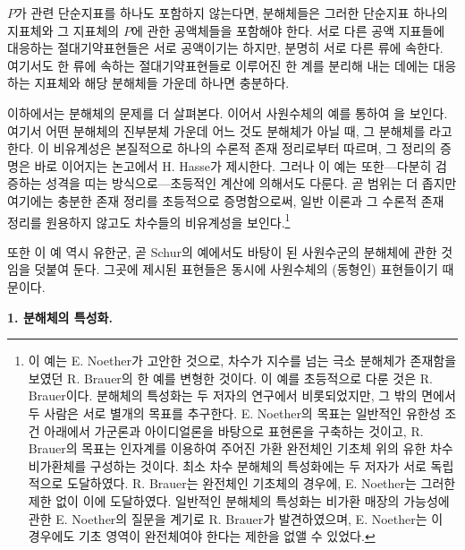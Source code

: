 $P$가 관련 단순지표를 하나도 포함하지 않는다면, 분해체들은 그러한 단순지표 하나의 지표체와 그 지표체의 $P$에 관한 공액체들을 포함해야 한다. 서로 다른 공액 지표들에 대응하는 절대기약표현들은 서로 공액이기는 하지만, 분명히 서로 다른 류에 속한다. 여기서도 한 류에 속하는 절대기약표현들로 이루어진 한 계를 분리해 내는 데에는 대응하는 지표체와 해당 분해체들 가운데 하나면 충분하다.

이하에서는 분해체의 문제를 더 살펴본다.  이어서 사원수체의 예를 통하여 을 보인다. 여기서 어떤 분해체의 진부분체 가운데 어느 것도 분해체가 아닐 때, 그 분해체를 라고 한다. 이 비유계성은 본질적으로 하나의 수론적 존재 정리로부터 따르며, 그 정리의 증명은 바로 이어지는 논고에서 H. Hasse가 제시한다. 그러나 이 예는 또한---다분히 검증하는 성격을 띠는 방식으로---초등적인 계산에 의해서도 다룬다. 곧 범위는 더 좁지만 여기에는 충분한 존재 정리를 초등적으로 증명함으로써, 일반 이론과 그 수론적 존재 정리를 원용하지 않고도 차수들의 비유계성을 보인다.\footnote{이 예는 E. Noether가 고안한 것으로, 차수가 지수를 넘는 극소 분해체가 존재함을 보였던 R. Brauer의 한 예를 변형한 것이다. 이 예를 초등적으로 다룬 것은 R. Brauer이다. 분해체의 특성화는 두 저자의 연구에서 비롯되었지만, 그 밖의 면에서 두 사람은 서로 별개의 목표를 추구한다. E. Noether의 목표는 일반적인 유한성 조건 아래에서 가군론과 아이디얼론을 바탕으로 표현론을 구축하는 것이고, R. Brauer의 목표는 인자계를 이용하여 주어진 가환 완전체인 기초체 위의 유한 차수 비가환체를 구성하는 것이다. 최소 차수 분해체의 특성화에는 두 저자가 서로 독립적으로 도달하였다. R. Brauer는 완전체인 기초체의 경우에, E. Noether는 그러한 제한 없이 이에 도달하였다. 일반적인 분해체의 특성화는 비가환 매장의 가능성에 관한 E. Noether의 질문을 계기로 R. Brauer가 발견하였으며, E. Noether는 이 경우에도 기초 영역이 완전체여야 한다는 제한을 없앨 수 있었다.}

또한 이 예 역시 유한군, 곧 Schur의 예에서도 바탕이 된 사원수군의 분해체에 관한 것임을 덧붙여 둔다. 그곳에 제시된 표현들은 동시에 사원수체의 (동형인) 표현들이기 때문이다.

\begin{center}
\textbf{1. 분해체의 특성화.}
\end{center}

